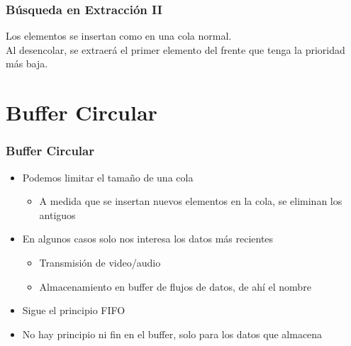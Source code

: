 \documentclass[11pt]{beamer}
\begin{document}
\begin{frame}\frametitle{Búsqueda en Extracción II}
\begin{block}{}
Los elementos se insertan como en una cola normal. \\
Al desencolar, se extraerá el primer elemento del frente que tenga la prioridad más baja.
\end{block}
\vspace{0.4cm}
\begin{center}
\end{center}
\end{frame}


\section{Buffer Circular}

\begin{frame}\frametitle{Buffer Circular}
\begin{itemize}
\item Podemos limitar el tamaño de una cola
    \begin{itemize}
    \item A medida que se insertan nuevos elementos en la cola, se eliminan los antiguos
    \end{itemize}
\item En algunos casos solo nos interesa los datos más recientes
    \begin{itemize}
    \item Transmisión de video/audio
    \item Almacenamiento en buffer de flujos de datos, de ahí el nombre
    \end{itemize}
\item Sigue el principio FIFO
\item No hay principio ni fin en el buffer, solo para los datos que almacena
\end{itemize}
\end{frame}
\end{document}

